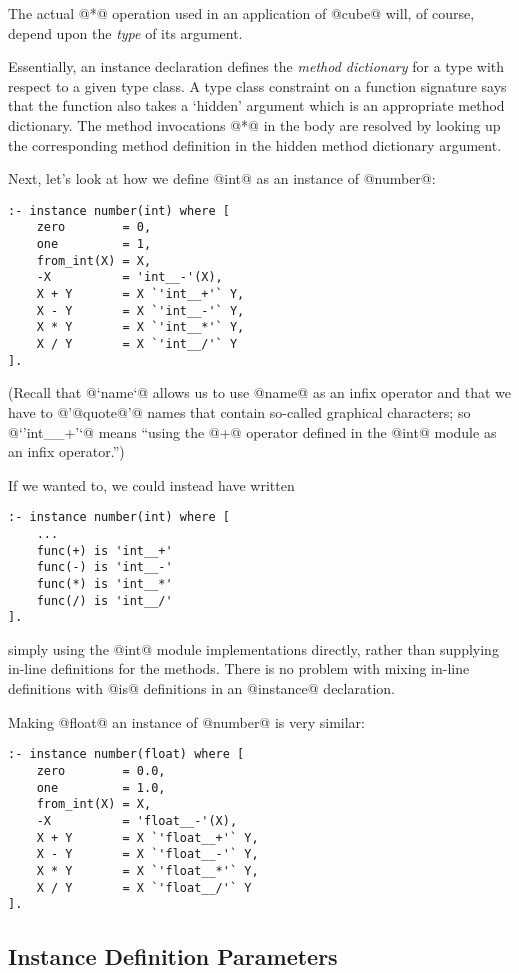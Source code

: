 The actual @*@ operation used in an application of @cube@ will, of
course, depend upon the \emph{type} of its argument.

Essentially, an instance declaration defines the \emph{method
dictionary} for a type with respect to a given type class.  A type
class constraint on a function signature says that the function also
takes a `hidden' argument which is an appropriate method dictionary.
The method invocations @*@ in the body are resolved by looking up
the corresponding method definition in the hidden method dictionary
argument.

Next, let's look at how we define @int@ as an instance of @number@:
\begin{verbatim}
:- instance number(int) where [
	zero        = 0,
    one         = 1,
    from_int(X) = X,
    -X          = 'int__-'(X),
    X + Y       = X `'int__+'` Y,
    X - Y       = X `'int__-'` Y,
    X * Y       = X `'int__*'` Y,
    X / Y       = X `'int__/'` Y
].
\end{verbatim}
(Recall that @`name`@ allows us to use @name@ as an infix operator and
that we have to @'@quote@'@ names that contain so-called graphical
characters; so @`'int__+'`@ means ``using the @+@ operator defined in
the @int@ module as an infix operator.'')

If we wanted to, we could instead have written
\begin{verbatim}
:- instance number(int) where [
    ...
    func(+) is 'int__+'
    func(-) is 'int__-'
    func(*) is 'int__*'
    func(/) is 'int__/'
].
\end{verbatim}
simply using the @int@ module implementations directly, rather than
supplying in-line definitions for the methods.  There is no problem
with mixing in-line definitions with @is@ definitions in an @instance@
declaration.

Making @float@ an instance of @number@ is very similar:
\begin{verbatim}
:- instance number(float) where [
	zero        = 0.0,
    one         = 1.0,
    from_int(X) = X,
    -X          = 'float__-'(X),
    X + Y       = X `'float__+'` Y,
    X - Y       = X `'float__-'` Y,
    X * Y       = X `'float__*'` Y,
    X / Y       = X `'float__/'` Y
].
\end{verbatim}

\subsection{Instance Definition Parameters}

